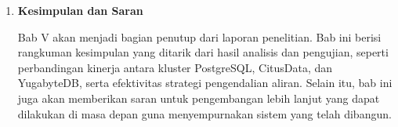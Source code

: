 \begin{enumerate}
      \item \textbf{Kesimpulan dan Saran}

            Bab V akan menjadi bagian penutup dari laporan penelitian. Bab ini berisi rangkuman kesimpulan yang ditarik dari hasil analisis dan pengujian, seperti perbandingan kinerja antara kluster PostgreSQL, CitusData, dan YugabyteDB, serta efektivitas strategi pengendalian aliran. Selain itu, bab ini juga akan memberikan saran untuk pengembangan lebih lanjut yang dapat dilakukan di masa depan guna menyempurnakan sistem yang telah dibangun.

\end{enumerate}
